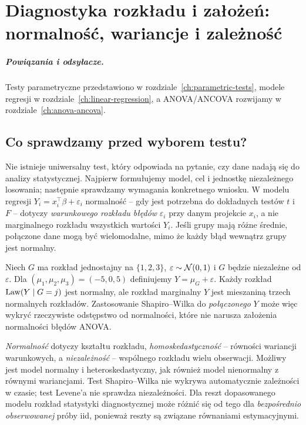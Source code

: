 \chapter{Diagnostyka rozkładu i założeń: normalność, wariancje i zależność}
\label{ch:diagnostics}
\paragraph{Powiązania i odsyłacze.} Testy parametryczne przedstawiono w rozdziale~\ref{ch:parametric-tests}, modele regresji w rozdziale~\ref{ch:linear-regression}, a ANOVA/ANCOVA rozwijamy w rozdziale~\ref{ch:anova-ancova}.


\section{Co sprawdzamy przed wyborem testu?}
Nie istnieje uniwersalny test, który odpowiada na pytanie, czy dane nadają się do analizy statystycznej. Najpierw formułujemy model, cel i jednostkę niezależnego losowania; następnie sprawdzamy wymagania konkretnego wniosku. W modelu regresji $Y_i=x_i^\top\beta+\varepsilon_i$ normalność -- gdy jest potrzebna do dokładnych testów $t$ i $F$ -- dotyczy \emph{warunkowego rozkładu błędów} $\varepsilon_i$ przy danym projekcie $x_i$, a nie marginalnego rozkładu wszystkich wartości $Y_i$. Jeśli grupy mają różne średnie, połączone dane mogą być wielomodalne, mimo że każdy błąd wewnątrz grupy jest normalny.

\begin{przyklad}
Niech $G$ ma rozkład jednostajny na $\{1,2,3\}$, $\varepsilon\sim\mathcal N(0,1)$ i $G$ będzie niezależne od $\varepsilon$. Dla $(\mu_1,\mu_2,\mu_3)=(-5,0,5)$ definiujemy $Y=\mu_G+\varepsilon$. Każdy rozkład $\operatorname{Law}(Y\mid G=j)$ jest normalny, ale rozkład marginalny $Y$ jest mieszaniną trzech normalnych rozkładów. Zastosowanie Shapiro--Wilka do \emph{połączonego} $Y$ może więc wykryć rzeczywiste odstępstwo od normalności, które nie narusza założenia normalności błędów ANOVA.
\end{przyklad}

\begin{uwaga}
\emph{Normalność} dotyczy kształtu rozkładu, \emph{homoskedastyczność} -- równości wariancji warunkowych, a \emph{niezależność} -- wspólnego rozkładu wielu obserwacji. Możliwy jest model normalny i heteroskedastyczny, jak również model nienormalny z równymi wariancjami. Test Shapiro--Wilka nie wykrywa automatycznie zależności w czasie; test Levene'a nie sprawdza niezależności. Dla reszt dopasowanego modelu rozkład statystyki diagnostycznej może różnić się od tego dla \emph{bezpośrednio obserwowanej} próby iid, ponieważ reszty są związane równaniami estymacyjnymi.
\end{uwaga}

